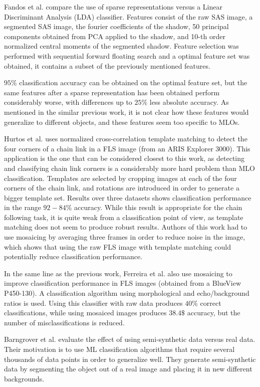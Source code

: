 Fandos et al. \cite{fandos2012sparse} compare the use of sparse representations versus a Linear Discriminant Analysis (LDA) classifier. Features consist of the raw SAS image, a segmented SAS image, the fourier coefficients of the shadow, 50 principal components obtained from PCA applied to the shadow, and 10-th order normalized central moments of the segmented shadow. Feature selection was performed with sequential forward floating search and a optimal feature set was obtained, it contains a subset of the previously mentioned features.

$95 \%$ classification accuracy can be obtained on the optimal feature set, but the same features after a sparse representation has been obtained perform considerably worse, with differences up to $25 \%$ less absolute accuracy. As mentioned in the similar previous work, it is not clear how these features would generalize to different objects, and these features seem too specific to MLOs.

Hurtos et al. \cite{hurtos2013automatic} uses normalized cross-correlation template matching to detect the four corners of a chain link in a FLS image (from an ARIS Explorer 3000). This application is the one that can be considered closest to this work, as detecting and classifying chain link corners is a considerably more hard problem than MLO classification.
Templates are selected by cropping images at each of the four corners of the chain link, and rotations are introduced in order to generate a bigger template set. Results over three datasets shows classification performance in the range $92-84 \%$ accuracy. While this result is appropriate for the chain following task, it is quite weak from a classification point of view, as template matching does not seem to produce robust results. Authors of this work had to use mosaicing by averaging three frames in order to reduce noise in the image, which shows that using the raw FLS image with template matching could potentially reduce classification performance.

In the same line as the previous work, Ferreira et al. \cite{ferreira2014improving} also use mosaicing to improve classification performance in FLS images (obtained from a BlueView P450-130). A classification algorithm using morphological and echo/background ratios is used. Using this classifier with raw data produces $40 \%$ correct classifications, while using mosaiced images produces $38.4 \$$ accuracy, but the number of misclassifications is reduced.

Barngrover et al. \cite{barngrover2015semisynthetic} evaluate the effect of using semi-synthetic data versus real data. Their motivation is to use ML classification algorithms that require several thousands of data points in order to generalize well. They generate semi-synthetic data by segmenting the object out of a real image and placing it in new different backgrounds.

